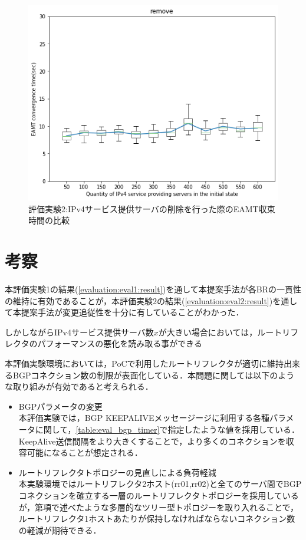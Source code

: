 \begin{figure}[]
    \begin{center}
    \includegraphics[width=12cm,pagebox=cropbox,clip]{img/eval2_result_remove.png}
    \end{center}
    \caption{評価実験2:IPv4サービス提供サーバの削除を行った際のEAMT収束時間の比較}
    \label{fig:eval2_result_remove}
\end{figure}



\newpage
\section{考察}
\label{evaluation:consideration}
本評価実験1の結果(\ref{evaluation:eval1:result})を通して本提案手法が各BRの一貫性の維持に有効であることが，本評価実験2の結果(\ref{evaluation:eval2:result})を通して本提案手法が変更追従性を十分に有していることがわかった．

しかしながらIPv4サービス提供サーバ数$x$が大きい場合においては，ルートリフレクタのパフォーマンスの悪化を読み取る事ができる

本評価実験環境においては，PoCで利用したルートリフレクタが適切に維持出来るBGPコネクション数の制限が表面化している．本問題に関しては以下のような取り組みが有効であると考えられる．
\begin{itemize}
    \item BGPパラメータの変更 \\
    本評価実験では，BGP KEEPALIVEメッセージージに利用する各種パラメータに関して，\ref{table:eval_bgp_timer}で指定したような値を採用している．KeepAlive送信間隔をより大きくすることで，より多くのコネクションを収容可能になることが想定される．
    \item ルートリフレクタトポロジーの見直しによる負荷軽減 \\
    本実験環境ではルートリフレクタ2ホスト(rr01,rr02)と全てのサーバ間でBGPコネクションを確立する一層のルートリフレクタトポロジーを採用しているが，第\label{proposal:network_rr}項で述べたような多層的なツリー型トポロジーを取り入れることで，ルートリフレクタ1ホストあたりが保持しなければならないコネクション数の軽減が期待できる．
\end{itemize}



